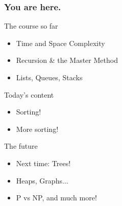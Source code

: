 \begin{frame}
	\frametitle{You are here.}
	\begin{block}{The course so far}
		\begin{itemize}
			\item Time and Space Complexity
			\item Recursion \& the Master Method
			\item Lists, Queues, Stacks
		\end{itemize}
	\end{block}
	\pause
	\begin{exampleblock}{Today's content}
		\begin{itemize}
			\item Sorting!
			\item More sorting!
		\end{itemize}
	\end{exampleblock}
	\pause
	\begin{block}{The future}
		\begin{itemize}
			\item Next time: Trees!
			\item Heaps, Graphs...
			\item P vs NP, and much more!
		\end{itemize}
	\end{block}
\end{frame}
